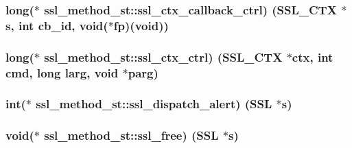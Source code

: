\subsubsection[{\texorpdfstring{ssl\+\_\+ctx\+\_\+callback\+\_\+ctrl}{ssl_ctx_callback_ctrl}}]{\setlength{\rightskip}{0pt plus 5cm}long($\ast$ ssl\+\_\+method\+\_\+st\+::ssl\+\_\+ctx\+\_\+callback\+\_\+ctrl) ({\bf S\+S\+L\+\_\+\+C\+TX} $\ast$s, int cb\+\_\+id, void($\ast${\bf fp})(void))}\hypertarget{structssl__method__st_a993fb1170221e955a38978690bbfde45}{}\label{structssl__method__st_a993fb1170221e955a38978690bbfde45}
\subsubsection[{\texorpdfstring{ssl\+\_\+ctx\+\_\+ctrl}{ssl_ctx_ctrl}}]{\setlength{\rightskip}{0pt plus 5cm}long($\ast$ ssl\+\_\+method\+\_\+st\+::ssl\+\_\+ctx\+\_\+ctrl) ({\bf S\+S\+L\+\_\+\+C\+TX} $\ast$ctx, int cmd, long larg, void $\ast$parg)}\hypertarget{structssl__method__st_a894ef584342f0b95ab4156cada689c99}{}\label{structssl__method__st_a894ef584342f0b95ab4156cada689c99}
\subsubsection[{\texorpdfstring{ssl\+\_\+dispatch\+\_\+alert}{ssl_dispatch_alert}}]{\setlength{\rightskip}{0pt plus 5cm}int($\ast$ ssl\+\_\+method\+\_\+st\+::ssl\+\_\+dispatch\+\_\+alert) ({\bf S\+SL} $\ast$s)}\hypertarget{structssl__method__st_a1164901a31bb98ce046b971a09b29321}{}\label{structssl__method__st_a1164901a31bb98ce046b971a09b29321}
\subsubsection[{\texorpdfstring{ssl\+\_\+free}{ssl_free}}]{\setlength{\rightskip}{0pt plus 5cm}void($\ast$ ssl\+\_\+method\+\_\+st\+::ssl\+\_\+free) ({\bf S\+SL} $\ast$s)}\hypertarget{structssl__method__st_a8df364610bd0f741b9fe078a69d88e28}{}\label{structssl__method__st_a8df364610bd0f741b9fe078a69d88e28}
